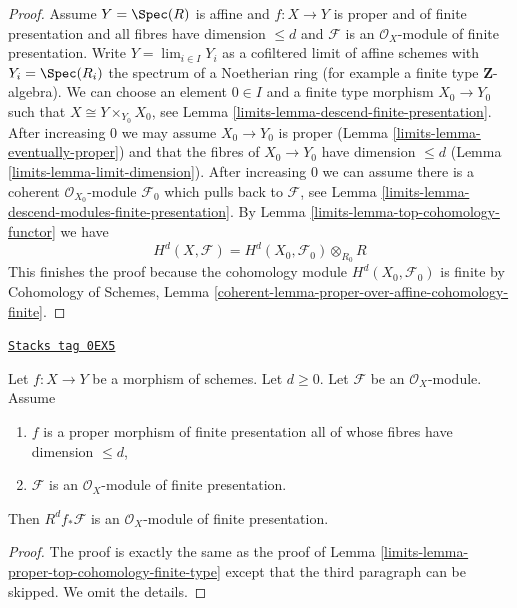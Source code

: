 \begin{proof}
\medskip\noindent
Assume $Y = \Spec(R)$ is affine and $f : X \to Y$
is proper and of finite presentation
and all fibres have dimension $\leq d$ and $\mathcal{F}$ is an
$\mathcal{O}_X$-module of finite presentation.
Write $Y = \lim_{i \in I} Y_i$ as a cofiltered limit of affine schemes
with $Y_i = \Spec(R_i)$ the spectrum of a Noetherian ring
(for example a finite type $\mathbf{Z}$-algebra).
We can choose an element $0 \in I$ and a finite type morphism
$X_0 \to Y_0$ such that $X \cong Y \times_{Y_0} X_0$, see
Lemma \ref{limits-lemma-descend-finite-presentation}.
After increasing $0$ we may assume $X_0 \to Y_0$ is proper
(Lemma \ref{limits-lemma-eventually-proper})
and that the fibres of $X_0 \to Y_0$ have dimension $\leq d$
(Lemma \ref{limits-lemma-limit-dimension}).
After increasing $0$ we can assume there is a coherent
$\mathcal{O}_{X_0}$-module $\mathcal{F}_0$ which pulls
back to $\mathcal{F}$, see
Lemma \ref{limits-lemma-descend-modules-finite-presentation}.
By Lemma \ref{limits-lemma-top-cohomology-functor}
we have
$$
H^d(X, \mathcal{F}) = H^d(X_0, \mathcal{F}_0) \otimes_{R_0} R
$$
This finishes the proof because the cohomology module
$H^d(X_0, \mathcal{F}_0)$ is finite by
Cohomology of Schemes, Lemma
\ref{coherent-lemma-proper-over-affine-cohomology-finite}.
\end{proof}

\begin{lemma}
\label{limits-lemma-proper-top-cohomology-finite-presentation}
\href{https://stacks.math.columbia.edu/tag/0EX5}{\texttt{Stacks tag 0EX5}}

Let $f : X \to Y$ be a morphism of schemes. Let $d \geq 0$.
Let $\mathcal{F}$ be an $\mathcal{O}_X$-module. Assume
\begin{enumerate}
\item $f$ is a proper morphism of finite presentation
all of whose fibres have dimension $\leq d$,
\item $\mathcal{F}$ is an $\mathcal{O}_X$-module of finite presentation.
\end{enumerate}
Then $R^df_*\mathcal{F}$ is an $\mathcal{O}_X$-module
of finite presentation.
\end{lemma}

\begin{proof}

The proof is exactly the same as the proof of
Lemma \ref{limits-lemma-proper-top-cohomology-finite-type}
except that the third paragraph can be skipped.
We omit the details.
\end{proof}

